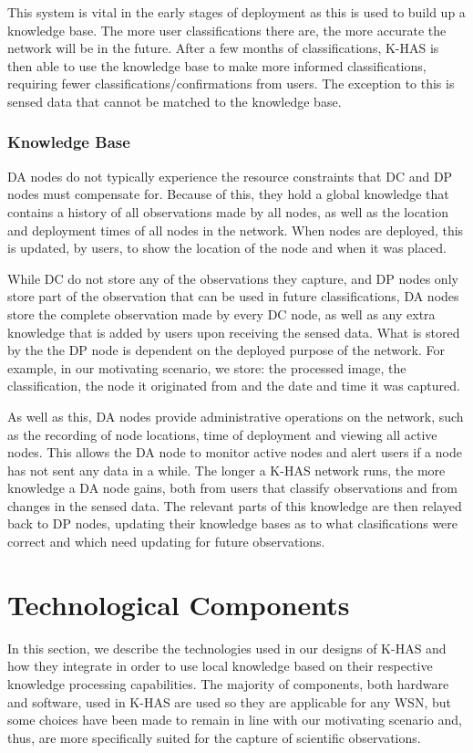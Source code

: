 	This system is vital in the early stages of deployment as this is used to build up a knowledge base. The more user classifications there are, the more accurate the network will be in the future. After a few months of classifications, K-HAS is then able to use the knowledge base to make more informed classifications, requiring fewer classifications/confirmations from users. The exception to this is sensed data that cannot be matched to the knowledge base.
	
	\subsubsection{Knowledge Base}
	DA nodes do not typically experience the resource constraints that DC and DP nodes must compensate for. Because of this, they hold a global knowledge that contains a history of all observations made by all nodes, as well as the location and deployment times of all nodes in the network. When nodes are deployed, this is updated, by users, to show the location of the node and when it was placed. 
	
	While DC do not store any of the observations they capture, and DP nodes only store part of the observation that can be used in future classifications, DA nodes store the complete observation made by every DC node, as well as any extra knowledge that is added by users upon receiving the sensed data. What is stored by the the DP node is dependent on the deployed purpose of the network. For example, in our motivating scenario, we store: the processed image, the classification, the node it originated from and the date and time it was captured.
	
	As well as this, DA nodes provide administrative operations on the network, such as the recording of node locations, time of deployment and viewing all active nodes. This allows the DA node to monitor active nodes and alert users if a node has not sent any data in a while. The longer a K-HAS network runs, the more knowledge a DA node gains, both from users that classify observations and from changes in the sensed data. The relevant parts of this knowledge are then relayed back to DP nodes, updating their knowledge bases as to what clasifications were correct and which need updating for future observations.
	
	
	\section{Technological Components}
	In this section, we describe the technologies used in our designs of K-HAS and how they integrate in order to use local knowledge based on their respective knowledge processing capabilities. The majority of components, both hardware and software, used in K-HAS are used so they are applicable for any WSN, but some choices have been made to remain in line with our motivating scenario and, thus, are more specifically suited for the capture of scientific observations.
	
